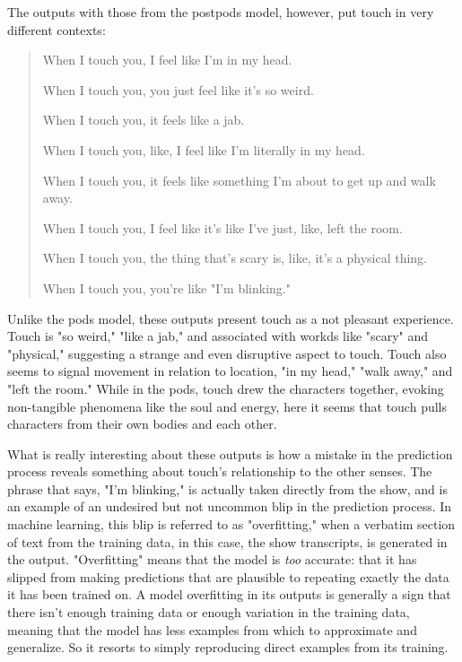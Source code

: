 \documentclass[11pt]{article}
\begin{document}
The outputs with those from the postpods model, however, put touch in
very different contexts:
\begin{quote}
When I touch you, I feel like I'm in my head.

When I touch you, you just feel like it's so weird.

When I touch you, it feels like a jab.

When I touch you, like, I feel like I'm literally in my head.

When I touch you, it feels like something I'm about to get up and
walk away.

When I touch you, I feel like it's like I've just, like, left the
room.

When I touch you, the thing that's scary is, like, it's a physical
thing.

When I touch you, you're like "I'm blinking."
\end{quote}
Unlike the pods model, these outputs present touch as a not pleasant
experience. Touch is "so weird," "like a jab," and associated with
workds like "scary" and "physical," suggesting a strange and even
disruptive aspect to touch. Touch also seems to signal movement in
relation to location, "in my head," "walk away," and "left the room."
While in the pods, touch drew the characters together, evoking
non-tangible phenomena like the soul and energy, here it seems that
touch pulls characters from their own bodies and each other.

What is really interesting about these outputs is how a mistake in the
prediction process reveals something about touch's relationship to the
other senses. The phrase that says, "I'm blinking," is actually taken
directly from the show, and is an example of an undesired but not
uncommon blip in the prediction process. In machine learning, this
blip is referred to as "overfitting," when a verbatim section of text
from the training data, in this case, the show transcripts, is
generated in the output. "Overfitting" means that the model is \emph{too}
accurate: that it has slipped from making predictions that are
plausible to repeating exactly the data it has been trained on. A
model overfitting in its outputs is generally a sign that there isn't
enough training data or enough variation in the training data, meaning
that the model has less examples from which to approximate and
generalize. So it resorts to simply reproducing direct examples from
its training.
\end{document}

